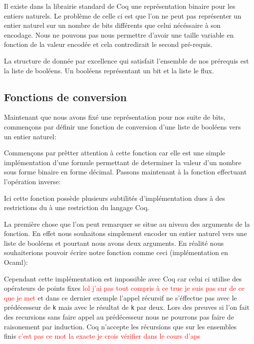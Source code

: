 \documentclass {article}
\newcommand{\codefrom}[3]
           {}
\newcommand{\codefromOcaml}[3]
           {}
\theoremstyle{definition}
\theoremstyle{remark}
\newcommand{\todo}[1]{\textcolor{red}{#1}}
\newcommand{\fun}[1]{\lstinline!#1!}
\begin{document}
Il existe dans la librairie standard de Coq une représentation binaire pour les entiers naturels.
Le problème de celle ci est que l'on ne peut pas représenter un entier naturel sur un nombre de bits différents
que celui nécéssaire à son encodage. Nous ne pouvons pas nous permettre d'avoir une taille variable en
fonction de la valeur encodée et cela contredirait le second pré-requis.

La structure de donnée par excellence qui satisfait l'ensemble de nos prérequis est la liste de booléens.
Un booléens représentant un bit et la liste le flux.

\codefrom{src}{ast_instructions}{binary_instruction}




\subsection{Fonctions de conversion}
\label{Fonctions de conversion}
Maintenant que nous avons fixé une représentation pour nos suite de bits, commençons par définir
une fonction de conversion d'une liste de booléens vers un entier naturel:

\codefrom{src}{binary}{bitn}

Commençons par prêtter attention à cette fonction car elle est une simple implémentation
d'une formule permettant de determiner la valeur d'un nombre sous forme binaire
en forme décimal. Passons maintenant à la fonction effectuant l'opération inverse:

\codefrom{src}{binary}{nbit}


Ici cette fonction possède plusieurs subtilités d'implémentation dues à des restrictions du
à une restriction du langage Coq.

La première chose que l'on peut remarquer se situe au niveau des arguments de
la fonction. En effet nous souhaitons simplement encoder un entier naturel vers
une liste de booléens et pourtant nous avons deux arguments.
En réalité nous souhaiterions pouvoir écrire notre fonction comme ceci
(implémentation en Ocaml):
\codefromOcaml{rapport}{example}{nbit}

Cependant cette implémentation est impossible avec Coq car celui ci utilise
des opérateurs de points fixes \todo{lol j'ai pas tout compris à ce truc je suis
  pas sur de ce que je met} et dans ce dernier exemple l'appel récursif ne s'éffectue
pas avec le prédécesseur de \fun{k}  mais avec le
résultat de \fun{k} par deux. Lors des preuves si l'on fait des recursions sans faire appel
au prédécesseur nous ne pourrons pas faire de raisonement par induction. Coq n'accepte les
récursions que sur les ensembles finis \todo{c'est pas ce mot la exacte je crois vérifier dans le cours d'aps}
\end{document}
